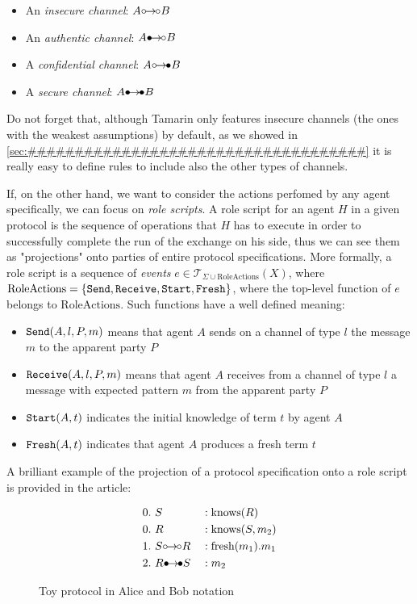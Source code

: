 \documentclass{article}
\def\ins{\hbox{$\circ$}\kern-1.5pt\hbox{$\to$}\kern -1pt\hbox{$\circ$}}
\def\sec{\hbox{$\bullet$}\kern-1.5pt\hbox{$\to$}\kern -1pt\hbox{$\bullet$}}
\def\auth{\hbox{$\bullet$}\kern-1.5pt\hbox{$\to$}\kern -1pt\hbox{$\circ$}}
\def\conf{\hbox{$\circ$}\kern-1.5pt\hbox{$\to$}\kern -1pt\hbox{$\bullet$}}
\newcommand{\mono}[1]{\textrm{\tt #1}}
\begin{document}
\begin{itemize}
    \item An \textit{insecure channel}: $A \ins B$
    \item An \textit{authentic channel}: $A \auth B$
    \item A \textit{confidential channel}: $A \conf B$
    \item A \textit{secure channel}: $A \sec B$
\end{itemize}

Do not forget that, although Tamarin only features insecure channels (the ones with the weakest assumptions) by default, as we showed in \ref{sec:####################################} it is really easy to define rules to include also the other types of channels.

If, on the other hand, we want to consider the actions perfomed by any agent specifically, we can focus on \textit{role scripts}. A role script for an agent $H$ in a given protocol is the sequence of operations that $H$ has to execute in order to successfully complete the run of the exchange on his side, thus we can see them as "projections" onto parties of entire protocol specifications. More formally, a role script is a sequence of \textit{events} $e \in \mathcal{T}_{\Sigma \cup \textrm{RoleActions}}(X)$, where $\textrm{RoleActions} = \{\mono{Send}, \mono{Receive}, \mono{Start}, \mono{Fresh} \}$, where the top-level function of $e$ belongs to $\textrm{RoleActions}$. Such functions have a well defined meaning:

\begin{itemize}
    \item $\mono{Send}(A,l,P,m)$ means that agent $A$ sends on a channel of type $l$ the message $m$ to the apparent party $P$
    \item $\mono{Receive}(A,l,P,m)$ means that agent $A$ receives from a channel of type $l$ a message with expected pattern $m$ from the apparent party $P$
    \item $\mono{Start}(A,t)$ indicates the initial knowledge of term $t$ by agent $A$
    \item $\mono{Fresh}(A,t)$ indicates that agent $A$ produces a fresh term $t$
\end{itemize}

A brilliant example of the projection of a protocol specification onto a role script is provided in the article:

\begin{figure}
\begin{alignat*}{3}\label{eq:toy_protocol}
    &0.\  S &&: \textrm{knows}(R)\\
    &0.\  R &&: \textrm{knows}(S, m_2)\\
    &1.\  S \ins R &&: \textrm{fresh}(m_1).m_1\\
    &2.\  R \sec S &&: m_2
\end{alignat*}
\caption{Toy protocol in Alice and Bob notation}
\end{figure}
\end{document}
